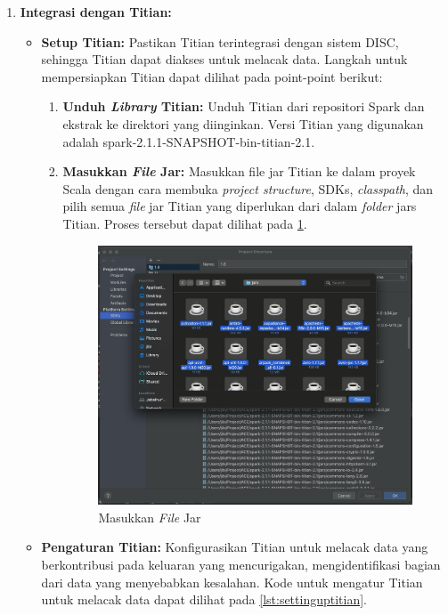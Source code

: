 \begin{enumerate}[topsep=0pt, itemsep=0pt]
  \item \textbf{Integrasi dengan Titian:}
  \begin{itemize}
      \item \textbf{Setup Titian:} Pastikan Titian terintegrasi dengan sistem DISC, sehingga Titian dapat diakses untuk melacak data.
      Langkah untuk mempersiapkan Titian dapat dilihat pada point-point berikut:
      \begin{enumerate}[topsep=0pt]
        \item \textbf{Unduh \emph{Library} Titian:} Unduh Titian dari repositori Spark dan ekstrak ke direktori yang diinginkan. Versi Titian yang digunakan adalah spark-2.1.1-SNAPSHOT-bin-titian-2.1.
        \item \textbf{Masukkan \emph{File} Jar:} Masukkan file jar Titian ke dalam proyek Scala dengan cara membuka \emph{project structure}, SDKs, \emph{classpath}, dan pilih semua 
        \emph{file} jar Titian yang diperlukan dari dalam \emph{folder} jars Titian. Proses tersebut dapat dilihat
        pada \ref{fig:masukkanfilejar}.

        \begin{figure}[H]
          \centering
          \includegraphics[scale=0.16]{gambar/MasukkanFileJar.png}
        
          \caption{Masukkan \emph{File} Jar}
          \label{fig:masukkanfilejar}
        \end{figure}
      \end{enumerate}
      \item \textbf{Pengaturan Titian:} Konfigurasikan Titian untuk melacak data yang berkontribusi pada keluaran yang mencurigakan, mengidentifikasi bagian dari data yang menyebabkan kesalahan.
      Kode untuk mengatur Titian untuk melacak data dapat dilihat pada \ref{lst:settinguptitian}.


\end{itemize}
\end{enumerate}
